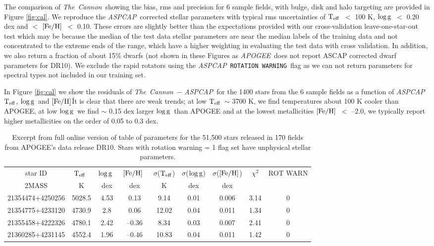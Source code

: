 \documentclass[12pt, preprint]{aastex}
\newcommand{\teff}{\mbox{$\rm T_{eff}$}}
\newcommand{\feh}{\mbox{$\rm [Fe/H]$}}
\newcommand{\logg}{\mbox{$\rm \log g$}}
\newcommand{\tc}{\textsl{The~Cannon}}
\newcommand{\apogee}{\textsl{APOGEE}}
\newcommand{\aspcap}{\textsl{ASPCAP}}
\newcommand{\rotwarn}{\texttt{ROTATION WARNING}}
\begin{document}
The comparison of \tc\, showing the bias, rms and precision for 6 sample fields, with bulge, disk and halo targeting are provided in Figure \ref{fig:cal}. We reproduce the \aspcap\ corrected stellar parameters with typical rms uncertainties of \teff\ $<$ 100 K, \logg\ $<$ 0.20 dex and $<$ \feh\ $<$ 0.10. These errors are slightly better than the expectations provided with our cross-validation leave-one-star-out test which may be because the median of the test data stellar parameters are near the median labels of the training data and not concentrated to the extreme ends of the range, which have a higher weighting in evaluating the test data with cross validation. In addition, we also return a fraction of about 15\% dwarfs (not shown in these Figures as \apogee\ does not report ASCAP corrected dwarf parameters for DR10). We exclude the rapid rotators using the \aspcap\ \rotwarn\ flag as we can not return parameters for spectral types not included in our training set. 

In Figure \ref{fig:cal} we show the residuals of \tc\ $-$ \aspcap\ for the 1400 stars from the 6 sample fields as a function of \aspcap\ \teff, \logg\ and \feh\. It is clear that there are weak trends; at low \teff\ $\sim$ 3700 K, we find temperatures about 100 K cooler than APOGEE, at low \logg\ we find $\sim$ 0.15 dex larger \logg\ than APOGEE and at the lowest metallicities \feh\ $<$ --2.0, we typically report higher metallicities on the order of 0.05 to 0.3 dex. 

\begin{table}[!h]
\small{
\centering
\caption{Excerpt from full online version of table of parameters for the 51,500 stars released in 170 fields from APOGEE's data release DR10. Stars with rotation warning = 1 flag set have unphysical stellar parameters.} \begin{tabular}{| c | c | c |  c | c | c |  c | c | c |}
\hline
star ID & \teff\ & \logg\ & \feh\ & $\sigma$(\teff) & $\sigma$(\logg) & $\sigma$(\feh) & $\chi^2$ & \tiny{ROT WARN}\\
{2MASS} &  K &  dex  & dex & K & dex & dex & & \\    
\hline
21354474+4250256 & 5028.5 & 4.53 & 0.13 & 9.14 & 0.01 & 0.006 & 3.14 & 0\\
21354775+4233120 & 4730.9 & 2.8 & 0.06 & 12.02 & 0.04 & 0.011 & 1.34 & 0\\
21355458+4222326 & 4780.1 & 2.42 & --0.36 & 8.34 & 0.03 & 0.007 & 2.41 & 0\\
21360285+4231145 &  4552.4 &  1.96 & --0.46  & 10.83 & 0.04 & 0.011 &  1.42 &  0\\
 \hline
\end{tabular}
\label{tab:online} }
\end{table}  
 
\end{document}
